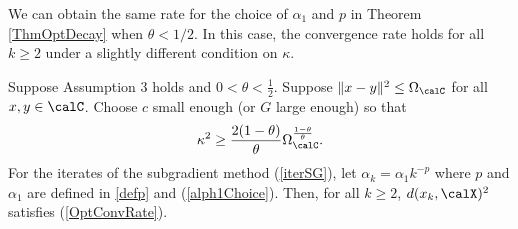 We can obtain the same rate for the choice of $\alpha_1$ and $p$ in Theorem \ref{ThmOptDecay} when $\theta<1/2$. In this case, the convergence rate holds for all $k\geq 2$ under a slightly different condition on $\kappa$. 

\begin{theorem}\label{OptimalP2}
Suppose Assumption 3 holds and $0< \theta< \frac{1}{2}$. 
Suppose $\|x-y\|^2\leq\Omega_{\calC}$ for all $x,y\in\calC$. 
Choose $c$ small enough (or $G$ large enough) so that 
\begin{eqnarray}
\kappa^2\label{secondKappaCond}
\geq
\frac{2(1-\theta)}{\theta}\Omega_\calC^{\frac{1-\theta}{\theta}}.
\end{eqnarray}
For the iterates of the subgradient method (\ref{iterSG}), let $\alpha_k = \alpha_1 k^{-p}$ 
where $p$
and $\alpha_1$ are defined in \eqref{defp}  and (\ref{alph1Choice}).
Then, for all $k\geq 2$, $d(x_k,\calX)^2$ satisfies (\ref{OptConvRate}).
\end{theorem}
